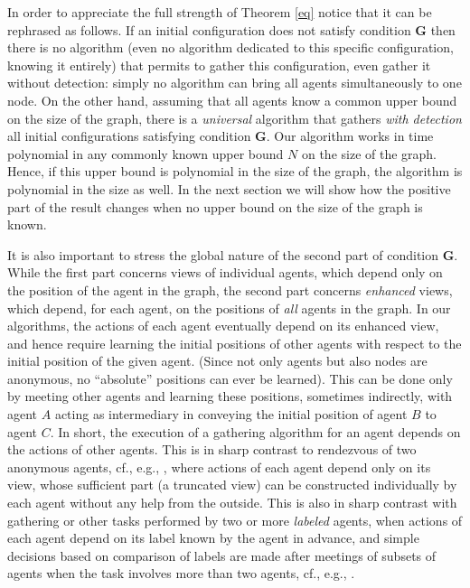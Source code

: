 \documentclass[11pt]{article}
\begin{document}
In order to appreciate the full strength of Theorem \ref{eq} notice that it can be rephrased as follows.  If  an initial configuration does not satisfy
condition {\bf G} then there is no algorithm (even no algorithm dedicated to this specific configuration, knowing it entirely) that permits to gather this configuration, even gather it without detection: simply no algorithm can bring all agents simultaneously to one node. On the other hand, assuming that all agents know a common 
upper bound on the size of the graph, there is a {\em universal} algorithm that gathers {\em with detection} all initial configurations
satisfying condition {\bf G}. Our algorithm works in time polynomial in any commonly known upper bound $N$ on the size of the graph. Hence,  if this upper bound is
polynomial in the size of the graph, the algorithm is polynomial in the size as well. 
In the next section we will show how the positive part of the result changes when no upper bound on the size of the graph is known. 

It is also important to stress the global nature of the second part of condition {\bf G}. While the first part concerns views of individual agents, which depend only on
the position of the agent in the graph, the second part concerns {\em enhanced} views, which depend, for each agent, on the positions of {\em all} agents in the graph.
In our algorithms, the actions of each agent eventually depend on its enhanced view, and hence require learning the initial positions of other agents with respect to the initial position of the given agent.
(Since not only agents but also nodes are anonymous, no ``absolute'' positions can ever be learned).
 This can be done
only by meeting other agents and learning these positions, sometimes indirectly, with agent $A$ acting as intermediary in conveying the initial position of agent $B$ 
to agent $C$. In short, the execution of a gathering algorithm for an agent depends on the actions of other agents. This is in sharp contrast to rendezvous of two anonymous agents, cf., e.g., \cite{CKP}, where actions of each agent depend only on its  view, whose sufficient part (a truncated view) can be constructed
individually by each agent without any help from the outside. This is also in sharp contrast with gathering or other tasks performed by two or more {\em labeled} agents, when actions of each agent depend on its label known by the agent in advance, and simple decisions based on comparison of labels are made after meetings
of subsets of agents when the task involves more than two agents,  cf., e.g., \cite{DPV}. 
\end{document}
